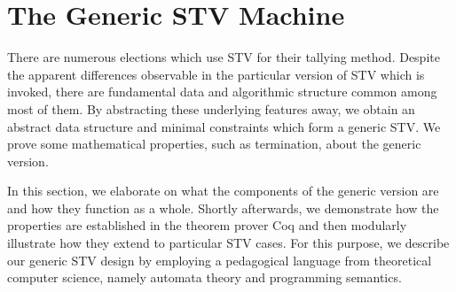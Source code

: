 \documentclass{llncs}
\begin{document}




\section{The Generic STV Machine}       
There are numerous elections which use STV for their tallying method. Despite the apparent differences observable in the particular version of STV which is invoked, there are fundamental data and algorithmic structure common among most of them. By abstracting these underlying features away, we obtain an abstract data structure and minimal constraints which form a generic STV. We prove some mathematical properties, such as termination, about the generic version.  


In this section, we elaborate on what the components of the generic version are and how they function as a whole. Shortly afterwards, we demonstrate how the properties  are established in the theorem prover Coq and then modularly illustrate how they extend to particular STV cases. For this purpose, we describe our generic STV design by employing a pedagogical language from theoretical computer science, namely automata theory and programming semantics.  

\end{document}
